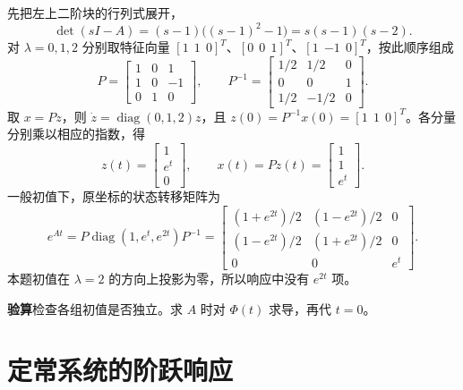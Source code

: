

\sol 先把左上二阶块的行列式展开，
\[
    \det(sI-A)=(s-1)\bigl((s-1)^2-1\bigr)
              =s(s-1)(s-2).
\]
对 $\lambda=0,1,2$ 分别取特征向量 $[1\ \ 1\ \ 0]^T$、$[0\ \ 0\ \ 1]^T$、$[1\ \ {-1}\ \ 0]^T$，按此顺序组成
\[
    P=\begin{bmatrix}1&0&1\\1&0&-1\\0&1&0\end{bmatrix},\qquad
    P^{-1}=\begin{bmatrix}1/2&1/2&0\\0&0&1\\1/2&-1/2&0\end{bmatrix}.
\]
取 $x=Pz$，则 $\dot z=\operatorname{diag}(0,1,2)z$，且
$z(0)=P^{-1}x(0)=[1\ \ 1\ \ 0]^T$。各分量分别乘以相应的指数，得
\[
    z(t)=\begin{bmatrix}1\\e^t\\0\end{bmatrix},\qquad
    \boxed{x(t)=Pz(t)=\begin{bmatrix}1\\1\\e^t\end{bmatrix}.}
\]
一般初值下，原坐标的状态转移矩阵为
\[
    e^{At}=P\operatorname{diag}(1,e^t,e^{2t})P^{-1}
    =\begin{bmatrix}
    (1+e^{2t})/2&(1-e^{2t})/2&0\\
    (1-e^{2t})/2&(1+e^{2t})/2&0\\
    0&0&e^t
    \end{bmatrix}.
\]
本题初值在 $\lambda=2$ 的方向上投影为零，所以响应中没有 $e^{2t}$ 项。

\noindent\textbf{验算}\quad 检查各组初值是否独立。求 $A$ 时对 $\Phi(t)$ 求导，再代 $t=0$。

\section{定常系统的阶跃响应}

